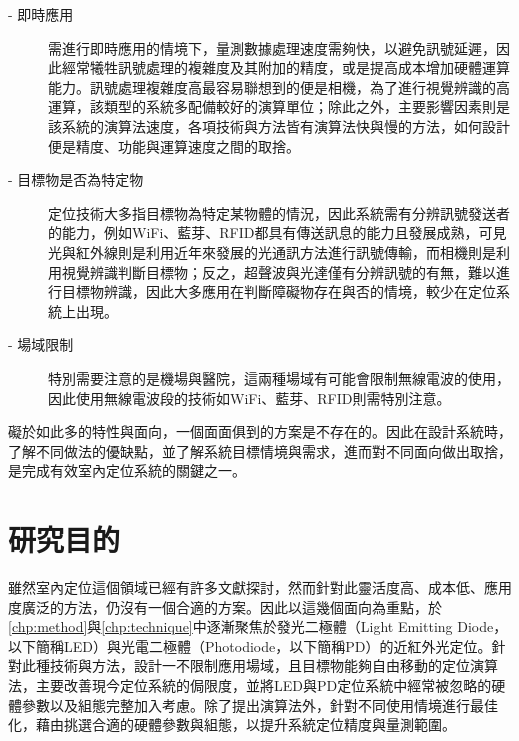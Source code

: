 \begin{description}
    \item[- 即時應用] \hfill 
    
    \qquad
    需進行即時應用的情境下，量測數據處理速度需夠快，以避免訊號延遲，因此經常犧牲訊號處理的複雜度及其附加的精度，或是提高成本增加硬體運算能力。訊號處理複雜度高最容易聯想到的便是相機，為了進行視覺辨識的高運算，該類型的系統多配備較好的演算單位\cite{survey_light2020}；除此之外，主要影響因素則是該系統的演算法速度，各項技術與方法皆有演算法快與慢的方法，如何設計便是精度、功能與運算速度之間的取捨。
    
    \item[- 目標物是否為特定物] \hfill 
    
    \qquad
    定位技術大多指目標物為特定某物體的情況，因此系統需有分辨訊號發送者的能力，例如WiFi、藍芽、RFID都具有傳送訊息的能力且發展成熟\cite{survey:indoor_wayfinding}，可見光與紅外線則是利用近年來發展的光通訊方法進行訊號傳輸，而相機則是利用視覺辨識判斷目標物；反之，超聲波與光達僅有分辨訊號的有無，難以進行目標物辨識，因此大多應用在判斷障礙物存在與否的情境，較少在定位系統上出現。
    
    \item[- 場域限制]\hfill 
    
    \qquad
    特別需要注意的是機場與醫院，這兩種場域有可能會限制無線電波的使用\cite{case:vlc_mobile}，因此使用無線電波段的技術如WiFi、藍芽、RFID則需特別注意。
\end{description}

礙於如此多的特性與面向，一個面面俱到的方案是不存在的。因此在設計系統時，了解不同做法的優缺點，並了解系統目標情境與需求，進而對不同面向做出取捨，是完成有效室內定位系統的關鍵之一\cite{survey_indoor2018}。













\section{研究目的}
\label{chp:purpose}
雖然室內定位這個領域已經有許多文獻探討，然而針對此靈活度高、成本低、應用度廣泛的方法，仍沒有一個合適的方案。因此以這幾個面向為重點，於\ref{chp:method}與\ref{chp:technique}中逐漸聚焦於發光二極體（Light Emitting Diode，以下簡稱LED）與光電二極體（Photodiode，以下簡稱PD）的近紅外光定位。針對此種技術與方法，設計一不限制應用場域，且目標物能夠自由移動的定位演算法，主要改善現今定位系統的侷限度，並將LED與PD定位系統中經常被忽略的硬體參數以及組態完整加入考慮。除了提出演算法外，針對不同使用情境進行最佳化，藉由挑選合適的硬體參數與組態，以提升系統定位精度與量測範圍。

